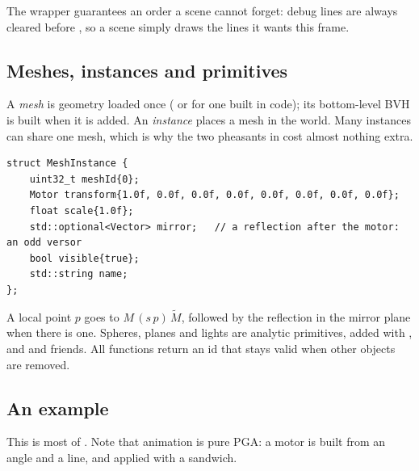 \documentclass[11pt,a4paper]{article}
\begin{document}
The wrapper guarantees an order a scene cannot forget: debug lines are always cleared before , so a scene simply draws the lines it wants this frame.

\subsection{Meshes, instances and primitives}

A \emph{mesh} is geometry loaded once ( or  for one built in code); its bottom-level BVH is built when it is added. An \emph{instance} places a mesh in the world. Many instances can share one mesh, which is why the two pheasants in  cost almost nothing extra.

\begin{lstlisting}
struct MeshInstance {
    uint32_t meshId{0};
    Motor transform{1.0f, 0.0f, 0.0f, 0.0f, 0.0f, 0.0f, 0.0f, 0.0f};
    float scale{1.0f};
    std::optional<Vector> mirror;   // a reflection after the motor: an odd versor
    bool visible{true};
    std::string name;
};
\end{lstlisting}

A local point $p$ goes to $M\,(s\,p)\,\widetilde{M}$, followed by the reflection in the mirror plane when there is one. Spheres, planes and lights are analytic primitives, added with ,  and  and friends. All  functions return an id that stays valid when other objects are removed.

\subsection{An example}

This is most of . Note that animation is pure PGA: a motor is built from an angle and a line, and applied with a sandwich.
\end{document}
